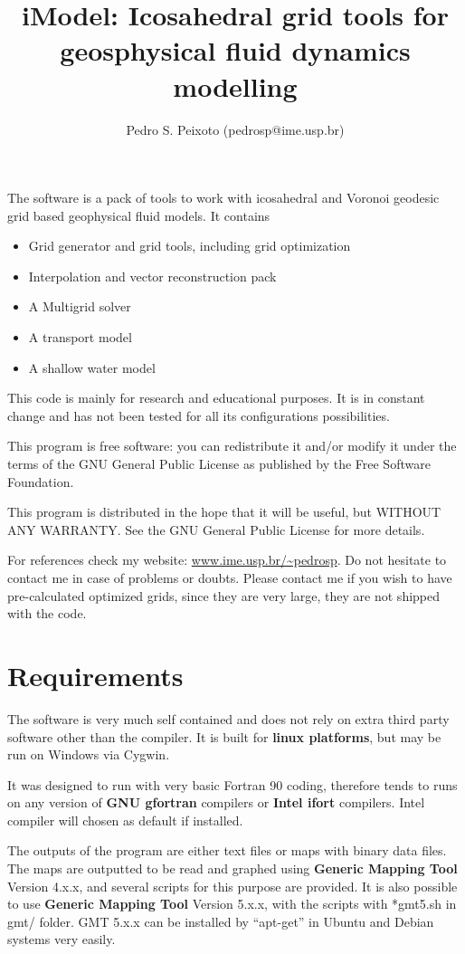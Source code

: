 \documentclass[a4paper,10pt]{article}
\title{iModel: Icosahedral grid tools for geosphysical fluid dynamics modelling}
\author{Pedro S. Peixoto (pedrosp@ime.usp.br)}
\begin{document}
\maketitle

The software is a pack of tools to work with icosahedral and Voronoi geodesic grid based geophysical fluid models. It contains
\begin{itemize}
 \item Grid generator and grid tools, including grid optimization
 \item Interpolation and vector reconstruction pack
  \item A Multigrid solver
 \item A transport model
 \item A shallow water model 
\end{itemize}



This code is mainly for research and educational purposes. It is in constant change and has not been tested for all its configurations possibilities. 

    This program is free software: you can redistribute it and/or modify
    it under the terms of the GNU General Public License as published by
    the Free Software Foundation.

    This program is distributed in the hope that it will be useful,
    but WITHOUT ANY WARRANTY. See the GNU General Public License for more details.


For references check my website: \url{www.ime.usp.br/~pedrosp}. Do not hesitate to contact me in case of problems or doubts. Please contact me if you wish to have pre-calculated optimized grids, since they are very large, they are not shipped with the code.


\section{Requirements}

The software is very much self contained and does not rely on extra third party software other than the compiler. It is built for \textbf{linux platforms}, but may be run on Windows via Cygwin.

It was designed to run with very basic Fortran 90 coding, therefore tends to runs on any version of \textbf{GNU gfortran} compilers or \textbf{Intel ifort} compilers. Intel compiler will chosen as default if installed.

The outputs of the program are either text files or maps with binary data files. The maps are outputted to be read and graphed using \textbf{Generic Mapping Tool} Version 4.x.x, and several scripts for this purpose are provided. It is also possible to use \textbf{Generic Mapping Tool} Version 5.x.x, with the scripts with *gmt5.sh in gmt/ folder. GMT 5.x.x can be installed by ``apt-get'' in Ubuntu and Debian systems very easily.
\end{document}
